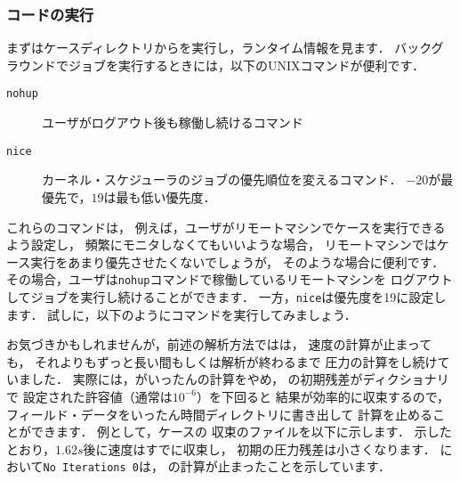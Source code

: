 \subsubsection{コードの実行}
\label{sssec:2.1.7.2}
まずはケースディレクトリからを実行し，ランタイム情報を見ます．
バックグラウンドでジョブを実行するときには，以下のUNIXコマンドが便利です．
\begin{description}
 \item[\texttt{nohup}]
            ユーザがログアウト後も稼働し続けるコマンド
 \item[\texttt{nice}]
            カーネル・スケジューラのジョブの優先順位を変えるコマンド．
            $-20$が最優先で，$19$は最も低い優先度．
\end{description}
これらのコマンドは，
例えば，ユーザがリモートマシンでケースを実行できるよう設定し，
頻繁にモニタしなくてもいいような場合，
リモートマシンではケース実行をあまり優先させたくないでしょうが，
そのような場合に便利です．
その場合，ユーザは\texttt{nohup}コマンドで稼働しているリモートマシンを
ログアウトしてジョブを実行し続けることができます．
一方，\texttt{nice}は優先度を19に設定します．
試しに，以下のようにコマンドを実行してみましょう．
お気づきかもしれませんが，前述の解析方法ではは，
速度の計算が止まっても，
それよりもずっと長い間もしくは解析が終わるまで
圧力の計算をし続けていました．
実際には，がいったんの計算をやめ，
の初期残差がディクショナリで
設定された許容値（通常は$10^{-6}$）を下回ると
結果が効率的に収束するので，
フィールド・データをいったん時間ディレクトリに書き出して
計算を止めることができます．
例として，ケースの
%
収束のファイルを以下に示します．
示したとおり，$1.62\unit{s}$後に速度はすでに収束し，
初期の圧力残差は小さくなります．
において\verb|No Iterations 0|は，
の計算が止まったことを示しています．
